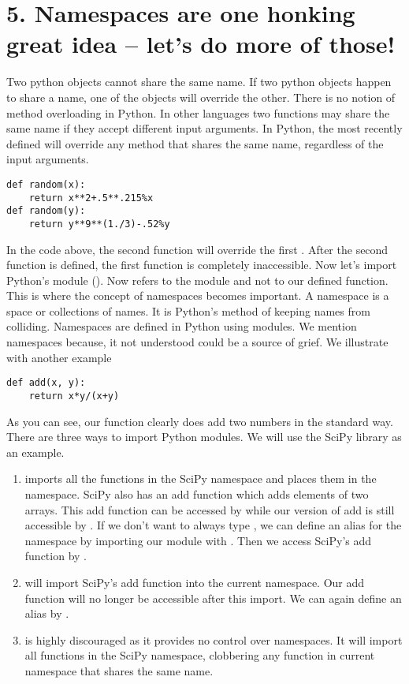 \section*{5. Namespaces are one honking great idea -- let's do more of those!}
Two python objects cannot share the same name.  If two python objects happen to share a name,
one of the objects will override the other.  There is no notion of method overloading in Python.
In other languages two functions may share the same name if they accept different input arguments.
In Python, the most recently defined will override any method that shares the same name,
regardless of the input arguments.
\begin{lstlisting}
def random(x):
    return x**2+.5**.215%x
def random(y):
    return y**9**(1./3)-.52%y
\end{lstlisting}
In the code above, the second  function will override the first .
After the second function is defined, the first function is completely inaccessible.
Now let's import Python's  module ().  Now  refers
to the module and not to our defined function.  This is where the concept of namespaces becomes important.
A namespace is a space or collections of names.  It is Python's method of keeping names from colliding.
Namespaces are defined in Python using modules.  We mention namespaces because, it not understood could be
a source of grief.  We illustrate with another example
\begin{lstlisting}
def add(x, y):
    return x*y/(x+y)
\end{lstlisting}
As you can see, our function clearly does add two numbers in the standard way.  There are three ways
to import Python modules.  We will use the SciPy library as an example.
\begin{enumerate}
\item {} imports all the functions in the SciPy namespace and places them in
the  namespace.  SciPy also has an add function which adds elements of two arrays.
This add function can be accessed by  while our version of add is still accessible by .
If we don't want to always type , we can define an alias for the namespace by importing our module
with .  Then we access SciPy's add function by .
\item {} will import SciPy's add function into the current namespace.  Our add function
will no longer be accessible after this import.  We can again define an alias by .
\item {} is highly discouraged as it provides no control over namespaces.  It will import all
functions in the SciPy namespace, clobbering any function in current namespace that shares the same name.
\end{enumerate}


